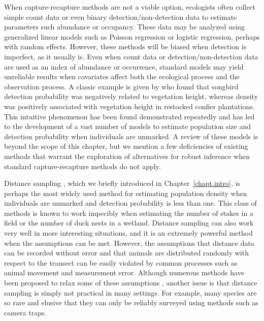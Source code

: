 When capture-recapture methods are not a viable option, ecologists
often collect simple count data or even binary detection/non-detection data
to estimate parameters such abundance or occupancy.
These
data may be analyzed using generalized linear models such as
Poisson regression or logistic regression, perhaps with random
effects. %
However, these methods will be biased when detection is imperfect, as
it usually is. Even when count data or detection/non-detection data are
used as an index of abundance or occurrence, standard models may yield
unreliable results when covariates affect both the ecological process
and the observation process. A classic example is given by
\citet{bibby_buckland:1987} who found that songbird detection
probability was negatively related to vegetation height, whereas
density was positively associated with vegetation height in restocked
confier plantations. This intuitive phenomenon has been
found demonstrated repeatedly \citep[e.g.][]{kery:2008,sillett_etal:2012} and has led to the
development of a vast number of models to estimate population size and
detection probability when individuals are unmarked. A review of these
models is beyond the scope of this
chapter, but we mention a few deficiencies of existing methods
that warrant the exploration of alternatives for robust inference when
standard capture-recapture methods do not apply.

Distance sampling \citep{buckland_etal:2001}, which we briefly
introduced in Chapter~\ref{chapt.intro},
is perhaps the most widely used method for
estimating population density when individuals are unmarked and
detection probability is less than one. This class of methods is known
to work impecibly when estimating the number of stakes in a field or
the number of duck nests in a wetland. Distance sampling can also work very well in
more interesting situations, and it is an extremely powerful method when
the assumptions can be met. However, the assumptions that distance
data can be recorded without error and that animals are distributed
randomly with respect to the transect can be easily violated by
common processes such as animal movement and measurement
error. Although numerous methods have been proposed to
relax some of these assumptions
\citet{royle_etal:2004, borchers_etal:1998, johnson_etal:2010,
  chandler_etal:2011},
another issue is that distance
sampling is simply not practical in many settings. For example, many
species are so rare and elusive that they can only be reliably
surveyed using methods such as camera traps.

